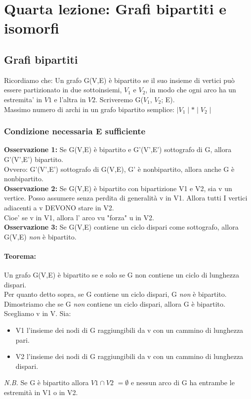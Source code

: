 \section{Quarta lezione: Grafi bipartiti e isomorfi}
\subsection{Grafi bipartiti}

Ricordiamo che: Un grafo G(V,E) è bipartito se il suo insieme di vertici può essere partizionato in due
sottoinsiemi, $V_1$ e $V_2$, in modo che ogni arco ha un estremita' in $V1$ e l'altra in $V2$. Scriveremo G($V_1$, $V_2$; E). \\
Massimo numero di archi in un grafo bipartito semplice: \( \mid V_1 \mid * \mid V_2 \mid \) 

\subsubsection{Condizione necessaria E sufficiente} 
\textbf{Osservazione 1:} Se G(V,E) è bipartito e G'(V',E') sottografo di G, allora G'(V',E') bipartito. \\
Ovvero:
G'(V',E') sottografo di G(V,E), G' è nonbipartito, allora anche G è nonbipartito. \\
\textbf{Osservazione 2:} Se G(V,E) è bipartito con bipartizione V1 e V2, sia v un vertice. Posso assumere senza perdita di generalità v in V1. Allora tutti I vertici adiacenti a v DEVONO stare in V2. \\
Cioe' se v in V1, allora l' arco vu "forza" u in V2.\\
\textbf{Osservazione 3:} Se G(V,E) contiene un ciclo dispari come sottografo, allora G(V,E) \emph{non} è bipartito.\\

\paragraph{Teorema:} 
Un grafo G(V,E) è bipartito se e solo se G non contiene un ciclo di lunghezza dispari. \\
Per quanto detto sopra, se G contiene un ciclo dispari, G \emph{non} è bipartito. \\
Dimostriamo che se G \emph{non} contiene un ciclo dispari, allora G è bipartito. Scegliamo v in V. Sia:
\begin{itemize}
\item V1 l'insieme dei nodi di G raggiungibili da v con un cammino di lunghezza pari.
\item V2 l'insieme dei nodi di G raggiungibili da v con un cammino di lunghezza dispari.
\end{itemize}
\emph{N.B.} Se G è bipartito allora \(V1 \cap V2 \)  $= \emptyset $ e nessun arco di G ha entrambe le estremità in V1 o in V2.


